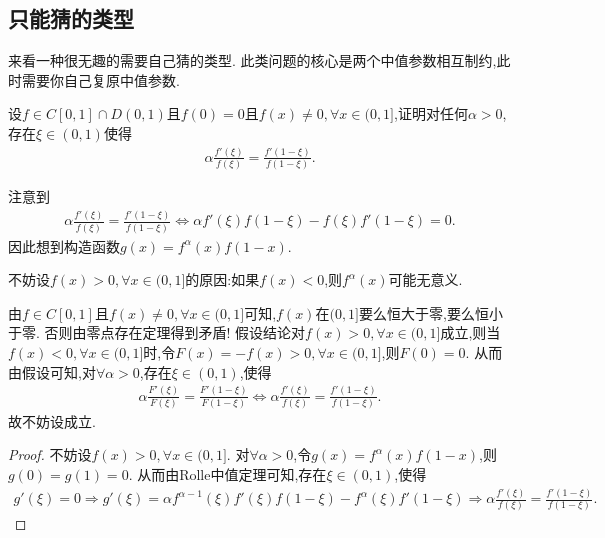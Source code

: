 \documentclass[../../main.tex]{subfiles}
\begin{document}
\subsection{只能猜的类型}
来看一种很无趣的需要自己猜的类型. 此类问题的核心是两个中值参数相互制约,此时需要你自己复原中值参数.

\begin{example}
设\(f\in C[0,1]\cap D(0,1)\)且\(f(0)=0\)且\(f(x)\neq0,\forall x\in(0,1]\),证明对任何\(\alpha>0\),存在\(\xi\in(0,1)\)使得
\begin{align*}
\alpha\frac{f'(\xi)}{f(\xi)}=\frac{f'(1 - \xi)}{f(1 - \xi)}.
\end{align*} 
\end{example}
\begin{remark}
注意到
\begin{align*}
\alpha \frac{f' \left( \xi \right)}{f\left( \xi \right)}=\frac{f' \left( 1-\xi \right)}{f\left( 1-\xi \right)}\Leftrightarrow \alpha f' \left( \xi \right) f\left( 1-\xi \right) -f\left( \xi \right) f' \left( 1-\xi \right) =0.
\end{align*}
因此想到构造函数$g(x)=f^{\alpha}(x)f(1 - x)$.
\end{remark}
\begin{note}
不妨设\(f(x)>0,\forall x\in(0,1]\)的原因:如果$f(x)<0$,则$f^{\alpha}(x)$可能无意义.

由\(f\in C[0,1]\)且\(f(x)\neq0,\forall x\in(0,1]\)可知,\(f(x)\)在\((0,1]\)要么恒大于零,要么恒小于零. 否则由零点存在定理得到矛盾! 假设结论对\(f(x)>0,\forall x\in(0,1]\)成立,则当\(f(x)<0,\forall x\in(0,1]\)时,令\(F(x)=-f(x)>0,\forall x\in(0,1]\),则\(F(0)=0\). 从而由假设可知,对\(\forall \alpha>0\),存在\(\xi\in(0,1)\),使得
\begin{align*}
\alpha \frac{F'(\xi)}{F(\xi)}=\frac{F'(1 - \xi)}{F(1 - \xi)}\Leftrightarrow \alpha \frac{f'(\xi)}{f(\xi)}=\frac{f'(1 - \xi)}{f(1 - \xi)}.
\end{align*}
故不妨设成立. 
\end{note}
\begin{proof}
不妨设\(f(x)>0,\forall x\in(0,1]\). 对$\forall \alpha>0$,令\(g(x)=f^{\alpha}(x)f(1 - x)\),则\(g(0)=g(1)=0\). 从而由Rolle中值定理可知,存在\(\xi\in(0,1)\),使得
\begin{align*}
g'(\xi) = 0\Rightarrow g'(\xi)=\alpha f^{\alpha - 1}(\xi)f'(\xi)f(1 - \xi)-f^{\alpha}(\xi)f'(1 - \xi)
\Rightarrow \alpha \frac{f'(\xi)}{f(\xi)}=\frac{f'(1 - \xi)}{f(1 - \xi)}.
\end{align*}
\end{proof}
\end{document}
